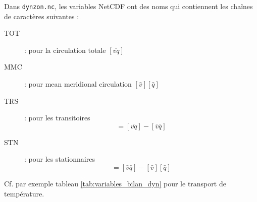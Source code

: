 \documentclass[a4paper,english,french]{article}
\begin{document}
Dans \verb+dynzon.nc+, les variables NetCDF ont des
noms qui contiennent les chaînes de caractères suivantes :
\begin{description}
\item[TOT] : pour la circulation totale $[\overline{vq}]$
\item[MMC] : pour mean meridional circulation $[\bar v] [\bar q]$
\item[TRS] : pour les transitoires
  \begin{equation*}
    [\overline{v' q'}] = [\overline{v q}] - [\bar v \bar q]
  \end{equation*}
\item[STN] : pour les stationnaires
  \begin{equation*}
    [\bar v^* \bar q^*] = [\bar v \bar q] - [\bar v] [\bar q]
  \end{equation*}
\end{description}
Cf. par exemple tableau \ref{tab:variables_bilan_dyn} pour le
transport de température.
\end{document}
